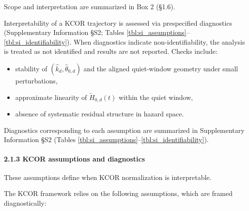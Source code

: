 \documentclass[
]{article}
\providecommand{\tightlist}{%
  \setlength{\itemsep}{0pt}\setlength{\parskip}{0pt}}
\begin{document}
Scope and interpretation are summarized in Box 2 (§1.6).

Interpretability of a KCOR trajectory is assessed via prespecified
diagnostics (Supplementary Information §S2; Tables
\ref{tbl:si_assumptions}--\ref{tbl:si_identifiability}). When
diagnostics indicate non-identifiability, the analysis is treated as not
identified and results are not reported. Checks include:

\begin{itemize}
\tightlist
\item
  stability of \((\hat{k}_d,\hat{\theta}_{0,d})\) and the aligned
  quiet-window geometry under small perturbations,
\item
  approximate linearity of \(\tilde H_{0,d}(t)\) within the quiet
  window,
\item
  absence of systematic residual structure in hazard space.
\end{itemize}

Diagnostics corresponding to each assumption are summarized in
Supplementary Information §S2 (Tables
\ref{tbl:si_assumptions}--\ref{tbl:si_identifiability}).

\paragraph{2.1.3 KCOR assumptions and
diagnostics}\label{kcor-assumptions-and-diagnostics}

These assumptions define when KCOR normalization is interpretable.

The KCOR framework relies on the following assumptions, which are framed
diagnostically:
\end{document}

